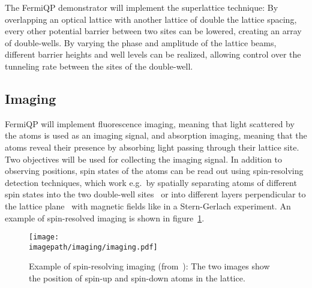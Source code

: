 The FermiQP demonstrator will implement the superlattice technique: By overlapping an optical lattice with another lattice of double the lattice spacing, every other potential barrier between two sites can be lowered, creating an array of double-wells. By varying the phase and amplitude of the lattice beams, different barrier heights and well levels can be realized, allowing control over the tunneling rate between the sites of the double-well.

\subsection*{Imaging}
FermiQP will implement fluorescence imaging, meaning that light scattered by the atoms is used as an imaging signal, and absorption imaging, meaning that the atoms reveal their presence by absorbing light passing through their lattice site. Two objectives will be used for collecting the imaging signal. In addition to observing positions, spin states of the atoms can be read out using spin-resolving detection techniques, which work e.g.~by spatially separating atoms of different spin states into the two double-well sites~\cite{boll_spin-_2016} or into different layers perpendicular to the lattice plane~\cite{koepsell_robust_2020} with magnetic fields like in a Stern-Gerlach experiment. An example of spin-resolved imaging is shown in figure~\ref{fig:absorption_image}.

\begin{figure}
    \centering
    \texttt{[image: \\imagepath/imaging/imaging.pdf]}
    \caption{Example of spin-resolving imaging (from~\cite{koepsell_robust_2020}): The two images show the position of spin-up and spin-down atoms in the lattice.}
    \label{fig:absorption_image}
\end{figure}

